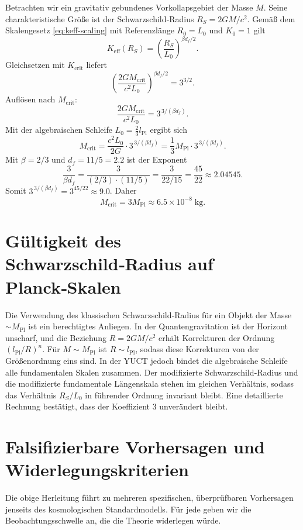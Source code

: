 \documentclass[11pt,a4paper]{article}
\newcommand{\Keff}{K_{\mathrm{eff}}}
\newcommand{\betaf}{\beta}
\newcommand{\Lpl}{l_{\mathrm{Pl}}}
\newcommand{\Lzero}{L_0}
\begin{document}
	Betrachten wir ein gravitativ gebundenes Vorkollapsgebiet der Masse \(M\). Seine charakteristische Größe ist der Schwarzschild‑Radius \(R_S = 2GM/c^2\). Gemäß dem Skalengesetz \eqref{eq:keff-scaling} mit Referenzlänge \(R_0 = \Lzero\) und \(K_0 = 1\) gilt
	\[
	\Keff(R_S) = \left( \frac{R_S}{\Lzero} \right)^{\betaf d_f / 2}.
	\]
	Gleichsetzen mit \(K_{\mathrm{crit}}\) liefert
	\[
	\left( \frac{2GM_{\mathrm{crit}}}{c^2 \Lzero} \right)^{\betaf d_f / 2} = 3^{3/2}.
	\]
	Auflösen nach \(M_{\mathrm{crit}}\):
	\[
	\frac{2GM_{\mathrm{crit}}}{c^2 \Lzero} = 3^{\,3/(\betaf d_f)}.
	\]
	Mit der algebraischen Schleife \(\Lzero = \frac{2}{3} \Lpl\) ergibt sich
	\[
	M_{\mathrm{crit}} = \frac{c^2 \Lzero}{2G} \cdot 3^{\,3/(\betaf d_f)} = \frac{1}{3} M_{\mathrm{Pl}} \cdot 3^{\,3/(\betaf d_f)}.
	\]
	Mit \(\betaf = 2/3\) und \(d_f = 11/5 = 2.2\) ist der Exponent
	\[
	\frac{3}{\betaf d_f} = \frac{3}{(2/3) \cdot (11/5)} = \frac{3}{22/15} = \frac{45}{22} \approx 2.04545.
	\]
	Somit \(3^{\,3/(\betaf d_f)} = 3^{45/22} \approx 9.0\). Daher
	\[
	M_{\mathrm{crit}} = 3 M_{\mathrm{Pl}} \approx 6.5 \times 10^{-8}\;\text{kg}.
	\]
	
	\section{Gültigkeit des Schwarzschild‑Radius auf Planck‑Skalen}
	
	Die Verwendung des klassischen Schwarzschild‑Radius für ein Objekt der Masse \(\sim M_{\mathrm{Pl}}\) ist ein berechtigtes Anliegen. In der Quantengravitation ist der Horizont unscharf, und die Beziehung \(R = 2GM/c^2\) erhält Korrekturen der Ordnung \((\Lpl/R)^n\). Für \(M \sim M_{\mathrm{Pl}}\) ist \(R \sim \Lpl\), sodass diese Korrekturen von der Größenordnung eins sind. In der YUCT jedoch bindet die algebraische Schleife alle fundamentalen Skalen zusammen. Der modifizierte Schwarzschild‑Radius und die modifizierte fundamentale Längenskala stehen im gleichen Verhältnis, sodass das Verhältnis \(R_S / \Lzero\) in führender Ordnung invariant bleibt. Eine detaillierte Rechnung bestätigt, dass der Koeffizient 3 unverändert bleibt.
	
	\section{Falsifizierbare Vorhersagen und Widerlegungskriterien}
	
	Die obige Herleitung führt zu mehreren spezifischen, überprüfbaren Vorhersagen jenseits des kosmologischen Standardmodells. Für jede geben wir die Beobachtungsschwelle an, die die Theorie widerlegen würde.
	
\end{document}
